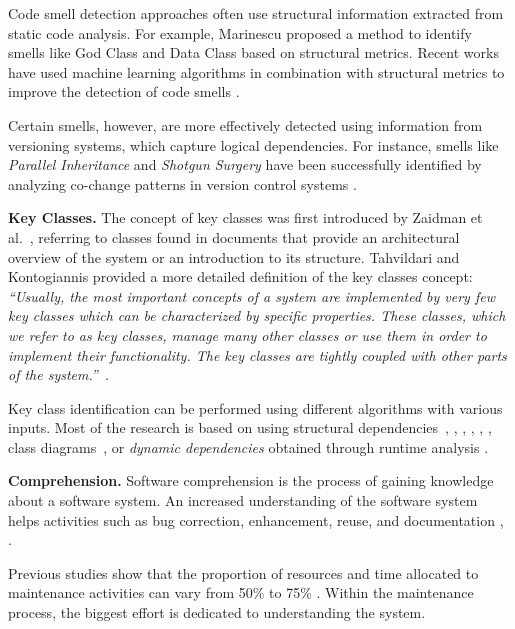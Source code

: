 Code smell detection approaches often use structural information extracted from static code analysis. For example, Marinescu \cite{Marinescu} proposed a method to identify smells like God Class and Data Class based on structural metrics. Recent works have used machine learning algorithms in combination with structural metrics to improve the detection of code smells \cite{code-smell-ml, PALOMBA20181}.

Certain smells, however, are more effectively detected using information from versioning systems, which capture logical dependencies. For instance, smells like \textit{Parallel Inheritance} and \textit{Shotgun Surgery} have been successfully identified by analyzing co-change patterns in version control systems \cite{6963448}.


\textbf{Key Classes.} The concept of key classes was first introduced by Zaidman et al.\ \cite{ZaidmanJurnal}, referring to classes found in documents that provide an architectural overview of the system or an introduction to its structure. Tahvildari and Kontogiannis provided a more detailed definition of the key classes concept: \textit{“Usually, the most important concepts of a system are implemented by very few key classes which can be characterized by specific properties. These classes, which we refer to as key classes, manage many other classes or use them in order to implement their functionality. The key classes are tightly coupled with other parts of the system.”}~\cite{Tahvildari2004ImprovingDQ}.

Key class identification can be performed using different algorithms with various inputs. Most of the research is based on using structural dependencies~\cite{PagerankENASE}, \cite{enase15}, \cite{PagerankSACI}, \cite{Finding-key-classes}, \cite{ZaidmanJurnal}, \cite{rocclasification}, class diagrams~\cite{6676885}, or \textit{dynamic dependencies} obtained through runtime analysis \cite{ZaidmanJurnal}. 

\textbf{Comprehension.}  
Software comprehension is the process of gaining knowledge about a software system. An increased understanding of the software system helps activities such as bug correction, enhancement, reuse, and documentation \cite{Comprehension}, \cite{1199197}. 

Previous studies show that the proportion of resources and time allocated to maintenance activities can vary from 50\% to 75\% \cite{articleLientz}. Within the maintenance process, the biggest effort is dedicated to understanding the system.


